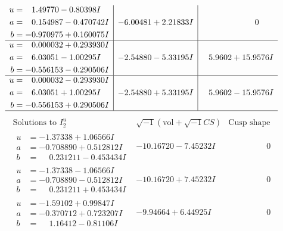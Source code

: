 \documentclass[1p]{elsarticle_modified}
\theoremstyle{definition}
\newcommand{\I}{\sqrt{-1}}
\begin{document}
$$\begin{array}{c|c|c}
\begin{aligned}
u &= \phantom{-}1.49770 - 0.80398 I \\
a &= \phantom{-}0.154987 - 0.470742 I \\
b &= -0.970975 + 0.160075 I\end{aligned}
 & -6.00481 + 2.21833 I & \phantom{-0.000000 } 0 \\ \hline\begin{aligned}
u &= \phantom{-}0.000032 + 0.293930 I \\
a &= \phantom{-}6.03051 - 1.00295 I \\
b &= -0.556153 - 0.290506 I\end{aligned}
 & -2.54880 - 5.33195 I & \phantom{-}5.9602 + 15.9576 I \\ \hline\begin{aligned}
u &= \phantom{-}0.000032 - 0.293930 I \\
a &= \phantom{-}6.03051 + 1.00295 I \\
b &= -0.556153 + 0.290506 I\end{aligned}
 & -2.54880 + 5.33195 I & \phantom{-}5.9602 - 15.9576 I\\
 \hline 
 \end{array}$$\newpage$$\begin{array}{c|c|c}  
\text{Solutions to }I^u_{2}& \I (\text{vol} + \sqrt{-1}CS) & \text{Cusp shape}\\
 \hline 
\begin{aligned}
u &= -1.37338 + 1.06566 I \\
a &= -0.708890 + 0.512812 I \\
b &= \phantom{-}0.231211 - 0.453434 I\end{aligned}
 & -10.16720 - 7.45232 I & \phantom{-0.000000 } 0 \\ \hline\begin{aligned}
u &= -1.37338 - 1.06566 I \\
a &= -0.708890 - 0.512812 I \\
b &= \phantom{-}0.231211 + 0.453434 I\end{aligned}
 & -10.16720 + 7.45232 I & \phantom{-0.000000 } 0 \\ \hline\begin{aligned}
u &= -1.59102 + 0.99847 I \\
a &= -0.370712 + 0.723207 I \\
b &= \phantom{-}1.16412 - 0.81106 I\end{aligned}
 & -9.94664 + 6.44925 I & \phantom{-0.000000 } 0 \\ \hline\begin{aligned}

\end{aligned}
\end{array}$$
\end{document}
